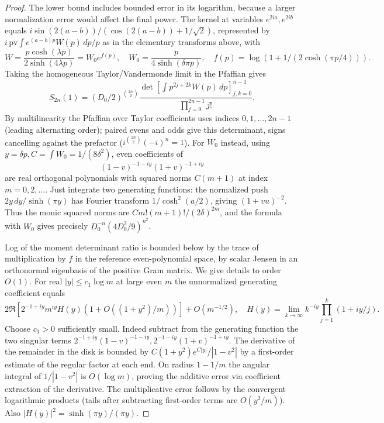 \begin{proof}
The lower bound includes bounded error in its logarithm, because a larger normalization error would affect the final power. The kernel at variables \(e^{2ia}, e^{2ib}\) equals \(i\sin(2(a-b))/(\cos(2(a-b))+1/\sqrt2)\), represented by \(i\,\mathrm{pv}\int e^{(a-b)p}W(p)\,dp/p\) as in the elementary transforms above, with
\[
 W=\frac{p\cosh(\lambda p)}{2\sinh(4\lambda p)}
 =W_0 e^{f(p)},\quad W_0=\frac{p}{4\sinh(\delta\pi p)},\quad f(p)=\log(1+1/(2\cosh(\pi p/4))).
\]
Taking the homogeneous Taylor/Vandermonde limit in the Pfaffian gives
\[
 S_{2n}(1)= (D_0/2)^{\binom{2n}2}\frac{\det[\int p^{2j+2k} W(p)\,dp]_{j,k=0}^{n-1}}{\prod_{j=0}^{2n-1}j!}.
\]
By multilinearity the Pfaffian over Taylor coefficients uses indices \(0,1,\ldots,2n-1\) (leading alternating order); paired evens and odds give this determinant, signs cancelling against the prefactor (\(i^{\binom{2n}2}(-i)^n=1\)). For \(W_0\) instead, using \(y=\delta p, C=\int W_0=1/(8\delta^2)\), even coefficients of
\[
 (1-v)^{-1-iy}(1+v)^{-1+iy}
\]
are real orthogonal polynomials with squared norms \(C(m+1)\) at index \(m=0,2,\ldots\). Just integrate two generating functions: the normalized push \(2y\,dy/\sinh(\pi y)\) has Fourier transform \(1/\cosh^2(a/2)\), giving \((1+vu)^{-2}\). Thus the monic squared norms are \(C m!(m+1)!/(2\delta)^{2m}\), and the formula with \(W_0\) gives precisely \(D_0^{-n}(4D_0^2/9)^{n^2}\).

Log of the moment determinant ratio is bounded below by the trace of multiplication by \(f\) in the reference even-polynomial space, by scalar Jensen in an orthonormal eigenbasis of the positive Gram matrix. We give details to order \(O(1)\). For real \(|y|\le c_1\log m\) at large even \(m\) the unnormalized generating coefficient equals
\[
 2\Re\left[2^{-1+iy} m^{iy} H(y)(1+O((1+y^2)/m))\right]+O(m^{-1/2}),\quad
 H(y)=\lim_{k\to\infty} k^{-iy}\prod_{j=1}^k(1+iy/j).
\]
Choose \(c_1>0\) sufficiently small. Indeed subtract from the generating function the two singular terms \(2^{-1+iy}(1-v)^{-1-iy},2^{-1-iy}(1+v)^{-1+iy}\). The derivative of the remainder in the disk is bounded by \(C(1+y^2)e^{C|y|}/|1-v^2|\) by a first-order estimate of the regular factor at each end. On radius \(1-1/m\) the angular integral of \(1/|1-v^2|\) is \(O(\log m)\), proving the additive error via coefficient extraction of the derivative. The multiplicative error follows by the convergent logarithmic products (tails after subtracting first-order terms are \(O(y^2/m)\)). Also \(|H(y)|^2=\sinh(\pi y)/(\pi y)\).


\end{proof}
